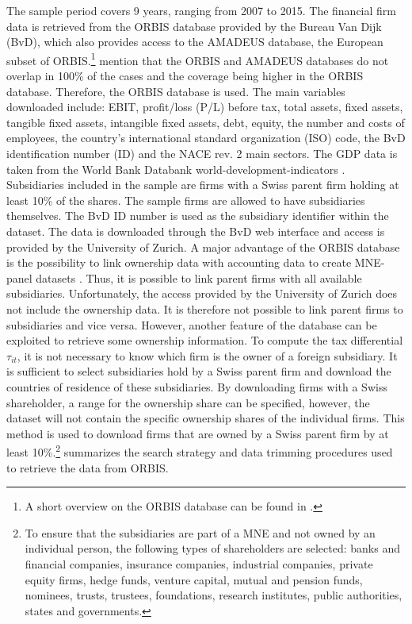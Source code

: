 \documentclass[10pt,twocolumn,oneside,cmyk]{article}
\begin{document}
The sample period covers 9 years, ranging from 2007 to 2015. The financial firm data is retrieved from the ORBIS database provided by the Bureau Van Dijk (BvD), which also provides access to the AMADEUS database, the European subset of ORBIS.\footnote{A short overview on the ORBIS database can be found in \textcite{ribeiro_oecd_2010}.} \textcite[14]{kalemli-ozcan_how_2015} mention that the ORBIS and AMADEUS databases do not overlap in 100\% of the cases and the coverage being higher in the ORBIS database. Therefore, the ORBIS database is used. The main variables downloaded include: EBIT, profit/loss (P/L) before tax, total assets, fixed assets, tangible fixed assets, intangible fixed assets, debt, equity, the number and costs of employees, the country's international standard organization (ISO) code, the BvD identification number (ID) and the NACE rev. 2 main sectors. The GDP data is taken from the World Bank Databank world-development-indicators \parencite{world_bank_databank_2017}. Subsidiaries included in the sample are firms with a Swiss parent firm holding at least 10\% of the shares. The sample firms are allowed to have subsidiaries themselves. The BvD ID number is used as the subsidiary identifier within the dataset. The data is downloaded through the BvD web interface and access is provided by the University of Zurich. A major advantage of the ORBIS database is the possibility to link ownership data with accounting data to create MNE-panel datasets \parencite[for example][430]{beer_profit_2015}. Thus, it is possible to link parent firms with all available subsidiaries. Unfortunately, the access provided by the University of Zurich does not include the ownership data. It is therefore not possible to link parent firms to subsidiaries and vice versa. However, another feature of the database can be exploited to retrieve some ownership information. To compute the tax differential $\tau_{it}$, it is not necessary to know which firm is the owner of a foreign subsidiary. It is sufficient to select subsidiaries hold by a Swiss parent firm and download the countries of residence of these subsidiaries. By downloading firms with a Swiss shareholder, a range for the ownership share can be specified, however, the dataset will not contain the specific ownership shares of the individual firms. This method is used to download firms that are owned by a Swiss parent firm by at least 10\%.\footnote{To ensure that the subsidiaries are part of a MNE and not owned by an individual person, the following types of shareholders are selected: banks and financial companies, insurance companies, industrial companies, private equity firms, hedge funds, venture capital, mutual and pension funds, nominees, trusts, trustees, foundations, research institutes, public authorities, states and governments.}  summarizes the search strategy and data trimming procedures used to retrieve the data from ORBIS.
\end{document}
